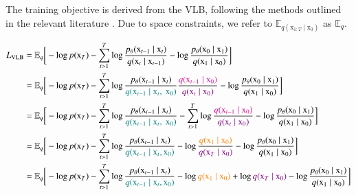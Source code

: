 \noindent The training objective is derived from the VLB, following the methods outlined in the relevant literature \cite{sohldickstein2015deep}\cite{ho2020denoising}\cite{luo2022understanding}. Due to space constraints, we refer to $\mathbb{E}_{q(\mathrm{x}_{1:T}\mid\mathrm{x}_{0})}$ as $\mathbb{E}_{q}$.

\begin{equation}\label{eqn:ELBO2}
    \begin{split}
        L_{\text{\scriptsize{\text{VLB}}}} & = \mathbb{E}_{q}\bigg[-\log p(\mathrm{x}_{T}) - \sum_{t>1}^{T} \log \frac{p_{\theta}(\mathrm{x}_{t-1}\mid\mathrm{x}_{t})}{q(\mathrm{x}_{t}\mid\mathrm{x}_{t-1})}-\log\frac{p_{\theta}(\mathrm{x}_{0}\mid\mathrm{x}_{1})}{q(\mathrm{x}_{1}\mid\mathrm{x}_{0})}\bigg] \\
        & = \mathbb{E}_{q}\bigg[-\log p(\mathrm{x}_{T}) - \sum_{t>1}^{T} \log \frac{p_{\theta}(\mathrm{x}_{t-1}\mid\mathrm{x}_{t})}{\textcolor{teal}{q(\mathrm{x}_{t-1}\mid\mathrm{x}_{t},~\mathrm{x}_{0})}}\frac{\textcolor{Magenta}{q(\mathrm{x}_{t-1}\mid\mathrm{x}_{0})}}{\textcolor{violet}{q(\mathrm{x}_{t}\mid\mathrm{x}_{0})}}-\log\frac{p_{\theta}(\mathrm{x}_{0}\mid\mathrm{x}_{1})}{q(\mathrm{x}_{1}\mid\mathrm{x}_{0})}\bigg] \\
        & = \mathbb{E}_{q}\bigg[-\log p(\mathrm{x}_{T}) - \sum_{t>1}^{T} \log \frac{p_{\theta}(\mathrm{x}_{t-1}\mid\mathrm{x}_{t})}{\textcolor{teal}{q(\mathrm{x}_{t-1}\mid\mathrm{x}_{t},~\mathrm{x}_{0})}} -\sum_{t>1}^{T}\log \frac{\textcolor{Magenta}{q(\mathrm{x}_{t-1}\mid\mathrm{x}_{0})}}{\textcolor{violet}{q(\mathrm{x}_{t}\mid\mathrm{x}_{0})}}-\log\frac{p_{\theta}(\mathrm{x}_{0}\mid\mathrm{x}_{1})}{q(\mathrm{x}_{1}\mid\mathrm{x}_{0})}\bigg] \\
        & = \mathbb{E}_{q}\bigg[-\log p(\mathrm{x}_{T}) - \sum_{t>1}^{T} \log \frac{p_{\theta}(\mathrm{x}_{t-1}\mid\mathrm{x}_{t})}{\textcolor{teal}{q(\mathrm{x}_{t-1}\mid\mathrm{x}_{t}, \mathrm{x}_{0})}}- \log\frac{\textcolor{orange}{q(\mathrm{x}_{1}\mid\mathrm{x}_{0})}}{\textcolor{violet}{q(\mathrm{x}_{T}\mid\mathrm{x}_{0})}} -\log\frac{p_{\theta}(\mathrm{x}_{0}\mid\mathrm{x}_{1})}{q(\mathrm{x}_{1}\mid\mathrm{x}_{0})}\bigg] \\
        & = \mathbb{E}_{q}\bigg[-\log p(\mathrm{x}_{T}) - \sum_{t>1}^{T} \log \frac{p_{\theta}(\mathrm{x}_{t-1}\mid\mathrm{x}_{t})}{\textcolor{teal}{q(\mathrm{x}_{t-1}\mid\mathrm{x}_{t}, \mathrm{x}_{0})}}- \log\textcolor{orange}{q(\mathrm{x}_{1}\mid\mathrm{x}_{0})} + \log \textcolor{violet}{q(\mathrm{x}_{T}\mid\mathrm{x}_{0})} -\log\frac{p_{\theta}(\mathrm{x}_{0}\mid\mathrm{x}_{1})}{q(\mathrm{x}_{1}\mid\mathrm{x}_{0})}\bigg] \\

\end{split}
\end{equation}
